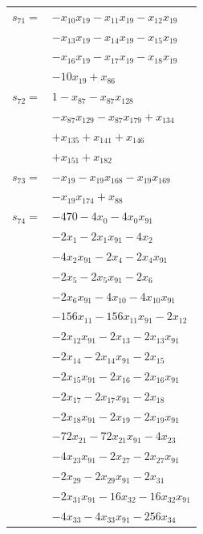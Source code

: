 \begin{longtable}{@{}r@{\;}l@{}}
\(s_{71}=\) & \(\displaystyle -x_{10}x_{19} -x_{11}x_{19} -x_{12}x_{19}\) \\
 & \(\displaystyle -x_{13}x_{19} -x_{14}x_{19} -x_{15}x_{19}\) \\
 & \(\displaystyle -x_{16}x_{19} -x_{17}x_{19} -x_{18}x_{19}\) \\
 & \(\displaystyle -10x_{19} +x_{86}\) \\[3pt]
\(s_{72}=\) & \(\displaystyle 1 -x_{87} -x_{87}x_{128}\) \\
 & \(\displaystyle -x_{87}x_{129} -x_{87}x_{179} +x_{134}\) \\
 & \(\displaystyle +x_{135} +x_{141} +x_{146}\) \\
 & \(\displaystyle +x_{151} +x_{182}\) \\[3pt]
\(s_{73}=\) & \(\displaystyle -x_{19} -x_{19}x_{168} -x_{19}x_{169}\) \\
 & \(\displaystyle -x_{19}x_{174} +x_{88}\) \\[3pt]
\(s_{74}=\) & \(\displaystyle -470 -4x_{0} -4x_{0}x_{91}\) \\
 & \(\displaystyle -2x_{1} -2x_{1}x_{91} -4x_{2}\) \\
 & \(\displaystyle -4x_{2}x_{91} -2x_{4} -2x_{4}x_{91}\) \\
 & \(\displaystyle -2x_{5} -2x_{5}x_{91} -2x_{6}\) \\
 & \(\displaystyle -2x_{6}x_{91} -4x_{10} -4x_{10}x_{91}\) \\
 & \(\displaystyle -156x_{11} -156x_{11}x_{91} -2x_{12}\) \\
 & \(\displaystyle -2x_{12}x_{91} -2x_{13} -2x_{13}x_{91}\) \\
 & \(\displaystyle -2x_{14} -2x_{14}x_{91} -2x_{15}\) \\
 & \(\displaystyle -2x_{15}x_{91} -2x_{16} -2x_{16}x_{91}\) \\
 & \(\displaystyle -2x_{17} -2x_{17}x_{91} -2x_{18}\) \\
 & \(\displaystyle -2x_{18}x_{91} -2x_{19} -2x_{19}x_{91}\) \\
 & \(\displaystyle -72x_{21} -72x_{21}x_{91} -4x_{23}\) \\
 & \(\displaystyle -4x_{23}x_{91} -2x_{27} -2x_{27}x_{91}\) \\
 & \(\displaystyle -2x_{29} -2x_{29}x_{91} -2x_{31}\) \\
 & \(\displaystyle -2x_{31}x_{91} -16x_{32} -16x_{32}x_{91}\) \\
 & \(\displaystyle -4x_{33} -4x_{33}x_{91} -256x_{34}\) \\

\end{longtable}
